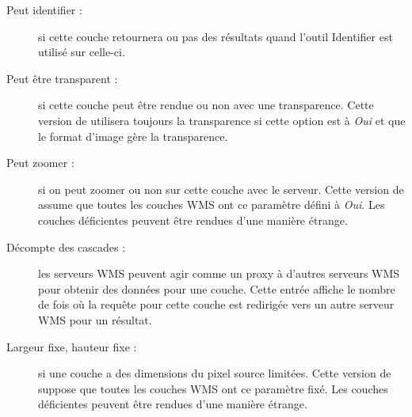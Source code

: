 \begin{itemize}[label=--]
\begin{description}
\item[Peut identifier :]  si cette couche retournera ou pas des résultats quand l'outil Identifier est utilisé sur celle-ci.

\item[Peut être transparent :]  si cette couche peut être rendue ou non avec une transparence. Cette version de \qg utilisera toujours la transparence si cette option est à \textsl{Oui} et que le format d'image gère la transparence.
\item[Peut zoomer :]  si on peut zoomer ou non sur cette couche avec le serveur. Cette version de \qg assume que toutes les couches WMS ont ce paramètre défini à \textsl{Oui}. Les couches déficientes peuvent être rendues d'une manière étrange.

\item[Décompte des cascades :]  les serveurs WMS peuvent agir comme un proxy à d'autres serveurs WMS pour obtenir des données pour une couche. Cette entrée affiche le nombre de fois où la requête pour cette couche est redirigée vers un autre serveur WMS pour un résultat.

\item[Largeur fixe, hauteur fixe :]  si une couche a des dimensions du pixel source limitées. Cette version de \qg suppose que toutes les couches WMS ont ce paramètre fixé. Les couches déficientes peuvent être rendues d'une manière étrange.


\end{description}
\end{itemize}
